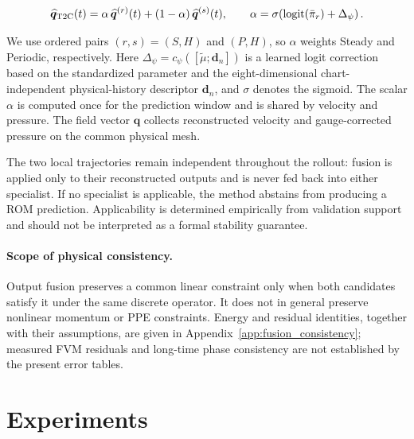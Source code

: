 \documentclass{article}
\begin{document}
\begin{equation}
  \widehat{\bm q}_{\rm T2C}(t)
  =\alpha\,\widehat{\bm q}^{(r)}(t)
  +(1-\alpha)\,\widehat{\bm q}^{(s)}(t),
  \qquad
  \alpha=
  \sigma\!\left(
  \operatorname{logit}(\bar\pi_r)+\Delta_\psi
  \right).
  \label{eq:main_t2c}
\end{equation}


We use ordered pairs $(r,s)=(S,H)$ and $(P,H)$, so $\alpha$ weights Steady and Periodic, respectively. Here $\Delta_\psi=c_\psi([\widetilde\mu;\bm d_n])$ is a learned logit correction based on the standardized parameter and the eight-dimensional chart-independent physical-history descriptor $\bm d_n$, and $\sigma$ denotes the sigmoid. The scalar $\alpha$ is computed once for the prediction window and is shared by velocity and pressure. The field vector $\bm q$ collects reconstructed velocity and gauge-corrected pressure on the common physical mesh.

The two local trajectories remain independent throughout the rollout: fusion is applied only to their reconstructed outputs and is never fed back into either specialist. If no specialist is applicable, the method abstains from producing a ROM prediction. Applicability is determined empirically from validation support and should not be interpreted as a formal stability guarantee.


\paragraph{Scope of physical consistency.}
Output fusion preserves a common linear constraint only when both
candidates satisfy it under the same discrete operator. It does not in
general preserve nonlinear momentum or PPE constraints. Energy and
residual identities, together with their assumptions, are given in
Appendix~\ref{app:fusion_consistency}; measured FVM residuals and long-time
phase consistency are not established by the present error tables.

\section{Experiments}
\label{sec:experiments}
\end{document}
